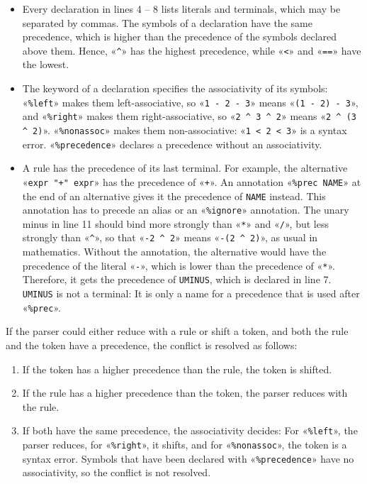 \documentclass[11pt,a4paper]{article}
\newcommand{\blue}[1]{{\color{blue}#1}}
\begin{document}
\begin{itemize}
\item Every declaration in lines 4 -- 8 lists literals and terminals, which may be separated by commas.  The
      symbols of a declaration have the same \blue{precedence}, which is higher than the precedence of the
      symbols declared above them.  Hence, «\verb|^|» has the highest precedence, while «\verb|<|» and
      «\verb|==|» have the lowest.
\item The keyword of a declaration specifies the \blue{associativity} of its symbols:  «\verb|%left|» makes them
      left-associative, so «\verb|1 - 2 - 3|» means «\verb|(1 - 2) - 3|», and «\verb|%right|» makes them
      right-associative, so «\verb|2 ^ 3 ^ 2|» means «\verb|2 ^ (3 ^ 2)|».  «\verb|%nonassoc|» makes them
      non-associative:  «\verb|1 < 2 < 3|» is a syntax error.  «\verb|%precedence|» declares a precedence without
      an associativity.
\item A rule has the precedence of its last terminal.  For example, the alternative «\verb|expr "+" expr|» has
      the precedence of «\verb|+|».  An annotation «\verb|%prec NAME|» at the end of an alternative gives it the
      precedence of \texttt{NAME} instead.  This annotation has to precede an alias or an «\verb|%ignore|»
      annotation.  The unary minus in line 11 should bind more strongly than «\verb|*|» and «\verb|/|», but
      less strongly than «\verb|^|», so that «\verb|-2 ^ 2|» means «\verb|-(2 ^ 2)|», as usual in mathematics.
      Without the annotation, the alternative would have the precedence of the literal «\verb|-|», which is
      lower than the precedence of «\verb|*|».  Therefore, it gets the precedence of \texttt{UMINUS}, which is
      declared in line 7.  \texttt{UMINUS} is not a terminal:  It is only a name for a precedence that is
      used after «\verb|%prec|».
\end{itemize}
If the parser could either reduce with a rule or shift a token, and both the rule and the token have a
precedence, the conflict is resolved as follows:
\begin{enumerate}
\item If the token has a higher precedence than the rule, the token is shifted.
\item If the rule has a higher precedence than the token, the parser reduces with the rule.
\item If both have the same precedence, the associativity decides:  For «\verb|%left|», the parser reduces,
      for «\verb|%right|», it shifts, and for «\verb|%nonassoc|», the token is a syntax error.  Symbols that
      have been declared with «\verb|%precedence|» have no associativity, so the conflict is not resolved.
\end{enumerate}
\end{document}
